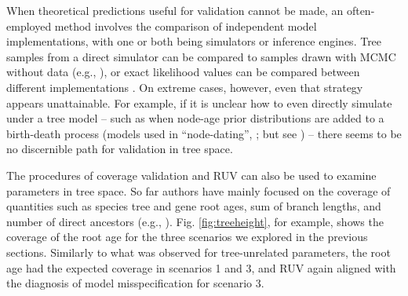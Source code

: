 \documentclass[oneside]{article}
\begin{document}
When theoretical predictions useful for validation cannot be made, an often-employed method involves the comparison of independent model implementations, with one or both being simulators or inference engines.
Tree samples from a direct simulator can be compared to samples drawn with MCMC without data (e.g., \citealp{zhang24}), or exact likelihood values can be compared between different implementations \citep{andreoletti22}.
On extreme cases, however, even that strategy appears unattainable.
For example, if it is unclear how to even directly simulate under a tree model -- such as when node-age prior distributions are added to a birth-death process (models used in ``node-dating'', \citealp{ho09}; but see \citealp{heled12}) -- there seems to be no discernible path for validation in tree space.

The procedures of coverage validation and RUV can also be used to examine parameters in tree space.
So far authors have mainly focused on the coverage of quantities such as species tree and gene root ages, sum of branch lengths, and number of direct ancestors (e.g., \citealp{gavryushkina14,ogilvie22,zhang24}).
Fig. \ref{fig:treeheight}, for example, shows the coverage of the root age for the three scenarios we explored in the previous sections.
Similarly to what was observed for tree-unrelated parameters, the root age had the expected coverage in scenarios 1 and 3, and RUV again aligned with the diagnosis of model misspecification for scenario 3.
\end{document}
